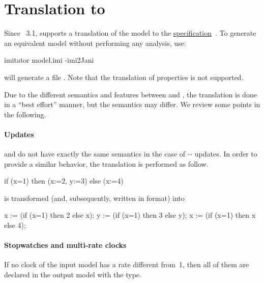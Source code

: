 \section{Translation to \jani{}}\label{section:jani}

Since \imitator{}~3.1, \imitator{} supports a translation of the model to the \href{https://jani-spec.org/}{\jani{} specification}~\cite{BDHHJT17}.
To generate an equivalent \jani{} model without performing any analysis, use:

\begin{terminal}
imitator model.imi -imi2Jani
\end{terminal}

\imitator{} will generate a file .
Note that the translation of properties is not supported.

Due to the different semantics and features between \imitator{} and \jani{}, the translation is done in a ``best effort'' manner, but the semantics may differ.
We review some points in the following.

\paragraph{Updates}
\imitator{} and \jani{} do not have exactly the same semantics in the case of -- updates.
In order to provide a similar behavior, the translation is performed as follow.

\begin{IMITATORmodel}
if (x=1) then (x:=2, y:=3) else (x:=4)
\end{IMITATORmodel}

\noindent{}is transformed (and, subsequently, written in \jani{} format) into

\begin{IMITATORmodel}
x := (if (x=1) then 2 else x);
y := (if (x=1) then 3 else y);
x := (if (x=1) then x else 4);
\end{IMITATORmodel}


\paragraph{Stopwatches and multi-rate clocks}
If no clock of the input model has a rate different from~1, then all of them are declared in the output \jani{} model with the  type.

